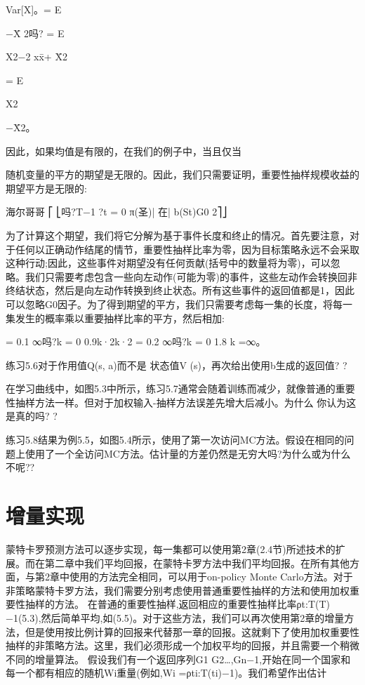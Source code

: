Var[X]。= E

−X̄
2吗?
= E

X2−2 xx̄+ X̄2

= E

X2

−X̄2。

因此，如果均值是有限的，在我们的例子中，当且仅当

随机变量的平方的期望是无限的。因此，我们只需要证明，重要性抽样规模收益的期望平方是无限的:



海尔哥哥
⎡
⎣吗?T−1 ?t = 0
π(圣)|
在| b(St)G0
2⎤⎦

为了计算这个期望，我们将它分解为基于事件长度和终止的情况。首先要注意，对于任何以正确动作结尾的情节，重要性抽样比率为零，因为目标策略永远不会采取这种行动;因此，这些事件对期望没有任何贡献(括号中的数量将为零)，可以忽略。我们只需要考虑包含一些向左动作(可能为零)的事件，这些左动作会转换回非终结状态，然后是向左动作转换到终止状态。所有这些事件的返回值都是1，因此可以忽略G0因子。为了得到期望的平方，我们只需要考虑每一集的长度，将每一集发生的概率乘以重要抽样比率的平方，然后相加:
 
 

= 0.1
∞吗?k = 0
0.9k·2k·2 = 0.2
∞吗?k = 0
1.8 k =∞。

练习5.6对于作用值Q(s, a)而不是
状态值V (s)，再次给出使用b生成的返回值? 					?

在学习曲线中，如图5.3中所示，练习5.7通常会随着训练而减少，就像普通的重要性抽样方法一样。但对于加权输入-抽样方法误差先增大后减小。为什么
你认为这是真的吗? 					?

练习5.8结果为例5.5，如图5.4所示，使用了第一次访问MC方法。假设在相同的问题上使用了一个全访问MC方法。估计量的方差仍然是无穷大吗?为什么或为什么不呢??

\section{增量实现}

蒙特卡罗预测方法可以逐步实现，每一集都可以使用第2章(2.4节)所述技术的扩展。而在第二章中我们平均回报，在蒙特卡罗方法中我们平均回报。在所有其他方面，与第2章中使用的方法完全相同，可以用于on-policy Monte Carlo方法。对于非策略蒙特卡罗方法，我们需要分别考虑使用普通重要性抽样的方法和使用加权重要性抽样的方法。
在普通的重要性抽样,返回相应的重要性抽样比率ρt:T(T)−1(5.3),然后简单平均,如(5.5)。对于这些方法，我们可以再次使用第2章的增量方法，但是使用按比例计算的回报来代替那一章的回报。这就剩下了使用加权重要性抽样的非策略方法。这里，我们必须形成一个加权平均的回报，并且需要一个稍微不同的增量算法。
假设我们有一个返回序列G1 G2…,Gn−1,开始在同一个国家和每一个都有相应的随机Wi重量(例如,Wi =ρti:T(ti)−1)。我们希望作出估计
 

